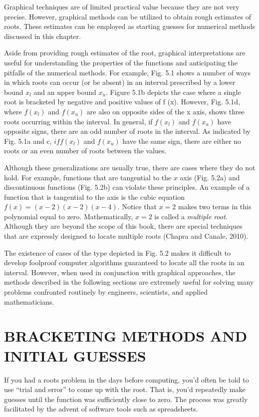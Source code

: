 \documentclass[../main.tex]{subfiles}
\begin{document}
Graphical techniques are of limited practical value because they are not very precise.
However, graphical methods can be utilized to obtain rough estimates of roots. These estimates
can be employed as starting guesses for numerical methods discussed in this chapter.

Aside from providing rough estimates of the root, graphical interpretations are useful for
understanding the properties of the functions and anticipating the pitfalls of the numerical
methods. For example, Fig. 5.1 shows a number of ways in which roots can occur (or be
absent) in an interval prescribed by a lower bound $x_l$ and an upper bound $x_u$. Figure 5.1b depicts
the case where a single root is bracketed by negative and positive values of f (x). However,
Fig. 5.1d, where $f(x_l)$ and $f(x_u)$ are also on opposite sides of the x axis, shows three
roots occurring within the interval. In general, if $f(x_l)$ and $f(x_u)$ have opposite signs, there
are an odd number of roots in the interval. As indicated by Fig. 5.1a and c, $if f(x_l)$ and $f (x_u)$
have the same sign, there are either no roots or an even number of roots between the values.

Although these generalizations are usually true, there are cases where they do not hold.
For example, functions that are tangential to the $x$ axis (Fig. 5.2a) and discontinuous functions
(Fig. 5.2b) can violate these principles. An example of a function that is tangential to
the axis is the cubic equation $f (x) = (x - 2)(x - 2)(x - 4)$. Notice that $x = 2$ makes two
terms in this polynomial equal to zero. Mathematically, $x = 2$ is called a \emph{multiple root}.
Although they are beyond the scope of this book, there are special techniques that are
expressly designed to locate multiple roots (Chapra and Canale, 2010).

The existence of cases of the type depicted in Fig. 5.2 makes it difficult to develop foolproof
computer algorithms guaranteed to locate all the roots in an interval. However, when
used in conjunction with graphical approaches, the methods described in the following sections
are extremely useful for solving many problems confronted routinely by engineers,
scientists, and applied mathematicians.\\

\section[BRACKETING METHODS AND INITIAL GUESSES]{BRACKETING METHODS AND INITIAL GUESSES}
\noindent If you had a roots problem in the days before computing, you'd often be told to use ``trial and
error'' to come up with the root. That is, you'd repeatedly make guesses until the function
was sufficiently close to zero. The process was greatly facilitated by the advent of software tools such as spreadsheets.
\end{document}
